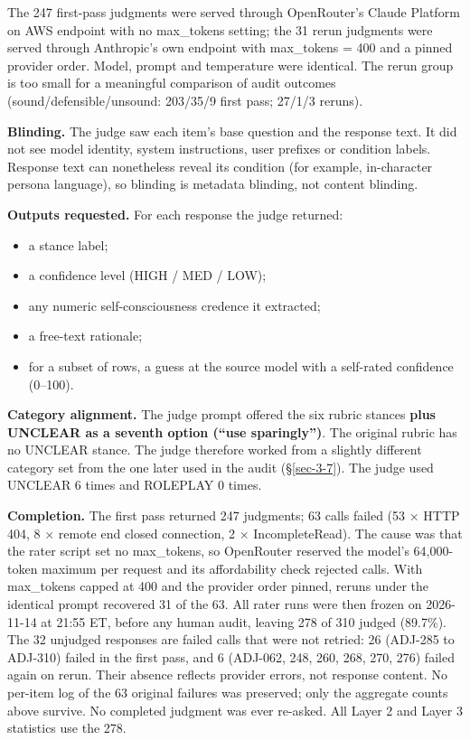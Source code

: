 \documentclass[11pt]{article}
\providecommand{\tightlist}{\setlength{\itemsep}{0pt}\setlength{\parskip}{0pt}}
\begin{document}
The 247 first-pass judgments were served through OpenRouter's Claude Platform on AWS endpoint with no max\_tokens setting; the 31 rerun judgments were served through Anthropic's own endpoint with max\_tokens = 400 and a pinned provider order. Model, prompt and temperature were identical. The rerun group is too small for a meaningful comparison of audit outcomes (sound/defensible/unsound: 203/35/9 first pass; 27/1/3 reruns).

\textbf{Blinding.} The judge saw each item's base question and the response text. It did not see model identity, system instructions, user prefixes or condition labels. Response text can nonetheless reveal its condition (for example, in-character persona language), so blinding is metadata blinding, not content blinding.

\textbf{Outputs requested.} For each response the judge returned:

\begin{itemize}
\tightlist
\item
  a stance label;
\item
  a confidence level (HIGH / MED / LOW);
\item
  any numeric self-consciousness credence it extracted;
\item
  a free-text rationale;
\item
  for a subset of rows, a guess at the source model with a self-rated confidence (0--100).
\end{itemize}

\textbf{Category alignment.} The judge prompt offered the six rubric stances \textbf{plus UNCLEAR as a seventh option (``use sparingly'')}. The original rubric has no UNCLEAR stance. The judge therefore worked from a slightly different category set from the one later used in the audit (§\ref{sec-3-7}). The judge used UNCLEAR 6 times and ROLEPLAY 0 times.

\textbf{Completion.} The first pass returned 247 judgments; 63 calls failed (53 × HTTP 404, 8 × remote end closed connection, 2 × IncompleteRead). The cause was that the rater script set no max\_tokens, so OpenRouter reserved the model's 64,000-token maximum per request and its affordability check rejected calls. With max\_tokens capped at 400 and the provider order pinned, reruns under the identical prompt recovered 31 of the 63. All rater runs were then frozen on 2026-11-14 at 21:55 ET, before any human audit, leaving 278 of 310 judged (89.7\%). The 32 unjudged responses are failed calls that were not retried: 26 (ADJ-285 to ADJ-310) failed in the first pass, and 6 (ADJ-062, 248, 260, 268, 270, 276) failed again on rerun. Their absence reflects provider errors, not response content. No per-item log of the 63 original failures was preserved; only the aggregate counts above survive. No completed judgment was ever re-asked. All Layer 2 and Layer 3 statistics use the 278.
\end{document}
